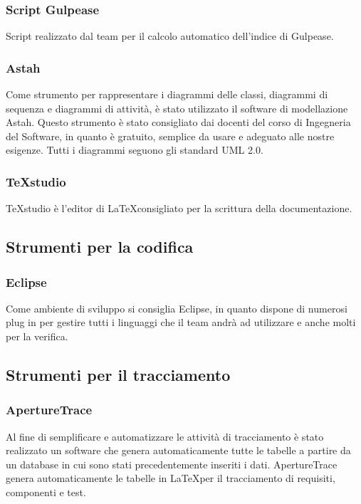 \subsubsection{Script Gulpease}
\label{}
Script realizzato dal team per il calcolo automatico dell'indice di Gulpease.

\subsubsection{Astah}
Come strumento per rappresentare i diagrammi delle classi, diagrammi di sequenza e diagrammi di attivit\`{a}, è stato utilizzato il software di modellazione Astah. Questo strumento è stato consigliato dai docenti del corso di Ingegneria del Software, in quanto è gratuito, semplice da usare e adeguato alle nostre esigenze. Tutti i diagrammi seguono gli standard UML 2.0.

\subsubsection{TeXstudio}
TeXstudio è l'editor di \LaTeX consigliato per la scrittura della documentazione.

\subsection{Strumenti per la codifica}
\subsubsection{Eclipse}
Come ambiente di sviluppo si consiglia Eclipse, in quanto dispone di numerosi plug in per gestire tutti i linguaggi che il team andrà ad utilizzare e anche molti per la verifica.


\subsection{Strumenti per il tracciamento}

\subsubsection{ApertureTrace}
\label{ApertureTrace}
Al fine di semplificare e automatizzare le attivit\`{a} di tracciamento è stato realizzato un software che genera automaticamente tutte le tabelle a partire da un database in cui sono stati precedentemente inseriti i dati. ApertureTrace genera automaticamente le tabelle in \LaTeX per il tracciamento di requisiti, componenti e test.


